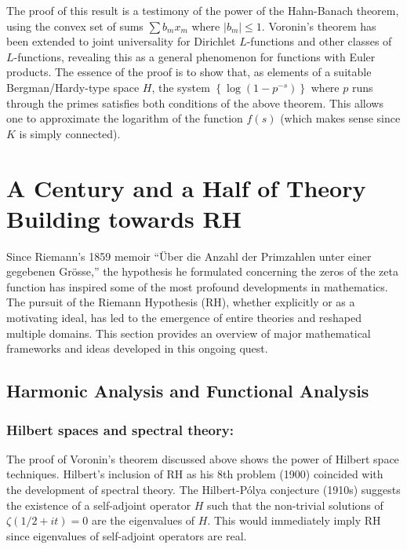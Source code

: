 \documentclass{article}
\begin{document}
  The proof of this result is a testimony of the power of the Hahn-Banach theorem, using the convex set of sums $\sum b_m x_m$ where $\vert b_m\vert \leq 1$.\newline      
    Voronin's theorem has been extended to joint universality for Dirichlet $L$-functions and other classes of $L$-functions, revealing this as a general phenomenon for functions with Euler products. The essence of the proof is to show that, as elements of a suitable Bergman/Hardy-type space $H$, the system $\left\{\log \left(1-p^{-s}\right)\right\}$ where $p$ runs through the primes  satisfies both conditions of the above theorem. This allows one to approximate the logarithm of the function $f(s)$ (which makes sense since $K$ is simply connected).

\section{ A Century and a Half of Theory Building towards RH}
Since Riemann's 1859 memoir ``Über die Anzahl der Primzahlen unter einer gegebenen Grösse,'' the hypothesis he formulated concerning the zeros of the zeta function has inspired some of the most profound developments in mathematics. 
The pursuit of the Riemann Hypothesis (RH), whether explicitly or as a motivating ideal, has led to the emergence of entire theories and reshaped multiple domains. This section provides an overview of major mathematical frameworks and ideas developed in this ongoing quest.



\subsection{Harmonic Analysis and Functional Analysis}

\subsubsection{Hilbert spaces and spectral theory:} The proof of Voronin's  theorem discussed above shows the power of Hilbert space techniques. Hilbert's inclusion of RH as his 8th problem (1900) coincided with the development of spectral theory. The Hilbert-Pólya conjecture (1910s) suggests the existence of  a self-adjoint operator $H$ such that the non-trivial solutions of  $\zeta(1/2 + it) = 0$ are the eigenvalues of $H$. This would immediately imply RH since eigenvalues of self-adjoint operators are real. 
\end{document}
